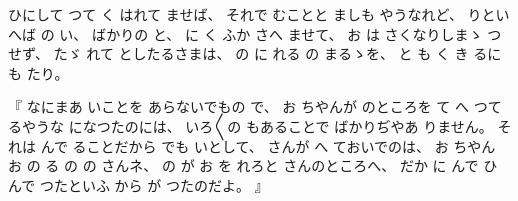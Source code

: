 ひにして
つて
く
はれて
ませば、
%
それで
むことと
ましも
やうなれど、
%
りといへば
の
い、
%
ばかりの
と、
%
に
く
ふか
さへ
ませて、
%
お
は
さくなりしまゝ
つせず、
%
たゞ
れて
としたるさまは、
%
の
に
れる
の
まるゝを、
%
と
も
く
き
るにも
たり。

%
『
なにまあ
いことを
あらないでもの
で、
%
お
ちやんが
のところを
て
へ
つて
るやうな
になつたのには、
%
いろ〳〵の
もあることで
ばかりぢやあ
りません。
%
それは
んで
ることだから
でも
いとして、
%
さんが
へ
ておいでのは、
%
お
ちやん
お
の
る
の
の
さんネ、
%
の
が
お
を
れろと
さんのところへ、
%
だか
に
んで
ひ
んで
つたといふ
から
が
つたのだよ。
』

